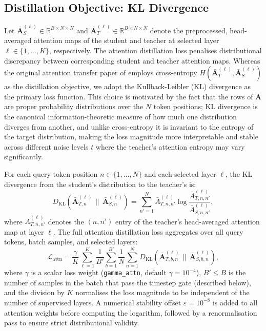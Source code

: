 \subsection*{Distillation Objective: KL Divergence}

Let $\bar{\mathbf{A}}_S^{(\ell)} \in \mathbb{R}^{B \times N \times N}$ and $\bar{\mathbf{A}}_T^{(\ell)} \in \mathbb{R}^{B \times N \times N}$ denote the preprocessed, head-averaged attention maps of the student and teacher at selected layer $\ell \in \{1, \ldots, K\}$, respectively. The attention distillation loss penalises distributional discrepancy between corresponding student and teacher attention maps. Whereas the original attention transfer paper of \cite{li2024surprising} employs cross-entropy $H(\bar{\mathbf{A}}_T^{(\ell)}, \bar{\mathbf{A}}_S^{(\ell)})$ as the distillation objective, we adopt the Kullback-Leibler (KL) divergence as the primary loss function. This choice is motivated by the fact that the rows of $\bar{\mathbf{A}}$ are proper probability distributions over the $N$ token positions; KL divergence is the canonical information-theoretic measure of how much one distribution diverges from another, and unlike cross-entropy it is invariant to the entropy of the target distribution, making the loss magnitude more interpretable and stable across different noise levels $t$ where the teacher's attention entropy may vary significantly.

For each query token position $n \in \{1, \ldots, N\}$ and each selected layer $\ell$, the KL divergence from the student's distribution to the teacher's is:
%
\begin{equation}
    D_{\mathrm{KL}}\!\left(\bar{\mathbf{A}}_{T,n}^{(\ell)} \,\big\|\, \bar{\mathbf{A}}_{S,n}^{(\ell)}\right)
    = \sum_{n'=1}^{N} \bar{A}_{T,n,n'}^{(\ell)} \log \frac{\bar{A}_{T,n,n'}^{(\ell)}}{\bar{A}_{S,n,n'}^{(\ell)}},
    \label{eq:kl_per_query}
\end{equation}
%
where $\bar{A}_{T,n,n'}^{(\ell)}$ denotes the $(n, n')$ entry of the teacher's head-averaged attention map at layer $\ell$. The full attention distillation loss aggregates over all query tokens, batch samples, and selected layers:
%
\begin{equation}
    \mathcal{L}_{\text{attn}} = \frac{\gamma}{K} \sum_{\ell=1}^{K} \frac{1}{B'} \sum_{b=1}^{B'} \frac{1}{N} \sum_{n=1}^{N} D_{\mathrm{KL}}\!\left(\bar{\mathbf{A}}_{T,b,n}^{(\ell)} \,\big\|\, \bar{\mathbf{A}}_{S,b,n}^{(\ell)}\right),
    \label{eq:loss_attn}
\end{equation}
%
where $\gamma$ is a scalar loss weight (\texttt{gamma\_attn}, default $\gamma = 10^{-4}$), $B' \leq B$ is the number of samples in the batch that pass the timestep gate (described below), and the division by $K$ normalises the loss magnitude to be independent of the number of supervised layers. A numerical stability offset $\varepsilon = 10^{-8}$ is added to all attention weights before computing the logarithm, followed by a renormalisation pass to ensure strict distributional validity.

